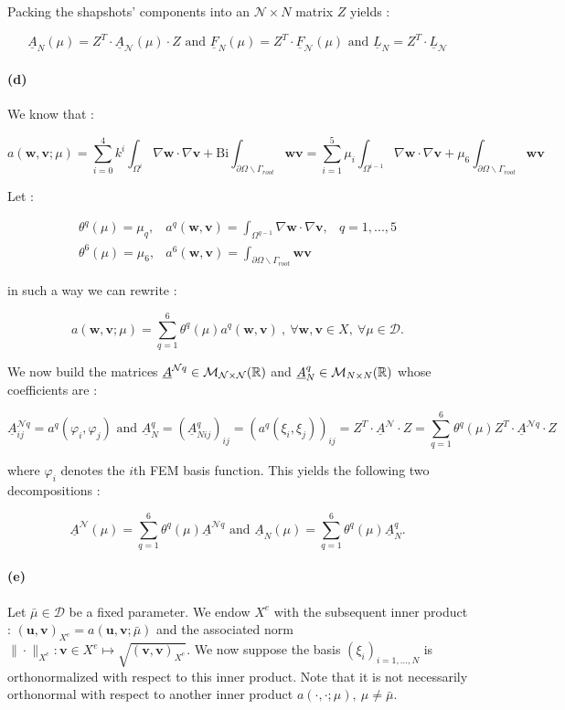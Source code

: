 \documentclass[a4paper]{article}
\newcounter{c}
\newcounter{d}
\newcounter{r}
\newcounter{e}
\newcommand{\R}{\mathbb{R}}
\newcommand{\mat}[2]{{\cal M}_{#1\times#2}(\R)}
\newcommand{\bu}{\mathbf u}
\newcommand{\bv}{\mathbf v}
\newcommand{\bw}{\mathbf w}
\begin{document}
Packing the shapshots' components into an $\mathcal N\times N$ matrix $Z$ yields :

$$\underline A_N(\mu)=Z^T\cdot\underline A_\mathcal{N}(\mu)\cdot Z\text{ and }\underline F_N(\mu)=Z^T\cdot\underline F_\mathcal{N}(\mu)\text{ and }\underline L_N=Z^T\cdot\underline L_\mathcal N$$

\paragraph{(d)}We know that :

$$a(\bw,\bv;\mu)=\sum_{i=0}^4k^i\int_{\Omega^i}\nabla\bw\cdot\nabla\bv+\text{Bi}\int_{\partial\Omega\backslash\Gamma_{root}}\bw\bv=\sum_{i=1}^5\mu_i\int_{\Omega^{i-1}}\nabla\bw\cdot\nabla\bv+\mu_6\int_{\partial\Omega\backslash\Gamma_{root}}\bw\bv$$

Let :

$$\begin{array}{llr}
\theta^q(\mu)=\mu_q,&a^q(\bw,\bv)=\int_{\Omega^{q-1}}\nabla\bw\cdot\nabla\bv,&q=1,...,5\\
\theta^6(\mu)=\mu_6,&a^6(\bw,\bv)=\int_{\partial\Omega\backslash\Gamma_{root}}\bw\bv&
\end{array}$$

in such a way we can rewrite :

$$a(\bw,\bv;\mu)=\sum_{q=1}^6\theta^q(\mu)a^q(\bw,\bv)~,~\forall\bw,\bv\in X,~\forall\mu\in\mathcal D.$$

We now build the matrices $\underline A^{\mathcal Nq}\in\mat{\mathcal N}{\mathcal N}$ and $\underline A^q_N\in\mat NN$ whose coefficients are :

$$\underline A^{\mathcal Nq}_{ij}=a^q(\varphi_i,\varphi_j)\text{ and }\underline A^q_N=(\underline A^q_{Nij})_{ij}=(a^q(\xi_i,\xi_j))_{ij}=Z^T\cdot\underline A^\mathcal N\cdot Z=\sum_{q=1}^6\theta^q(\mu)Z^T\cdot\underline A^{\mathcal Nq}\cdot Z$$

where $\varphi_i$ denotes the $i$th FEM basis function. This yields the following two decompositions :

$$\underline A^\mathcal N(\mu)=\sum_{q=1}^6\theta^q(\mu)\underline A^{\mathcal Nq}\text{ and }\underline A_N(\mu)=\sum_{q=1}^6\theta^q(\mu)\underline A_N^q.$$

\paragraph{(e)}Let $\bar\mu\in\mathcal D$ be a fixed parameter. We endow $X^e$ with the subsequent inner product : $(\bu,\bv)_{X^e}=a(\bu,\bv;\bar\mu)$ and the associated norm $\|\cdot\|_{X^e}:\bv\in X^e\mapsto\sqrt{(\bv,\bv)_{X^e}}$. We now suppose the basis $(\xi_i)_{i=1,...,N}$ is orthonormalized with respect to this inner product. Note that it is not necessarily orthonormal with respect to another inner product $a(\cdot,\cdot;\mu),~\mu\neq\bar\mu$.
\end{document}
